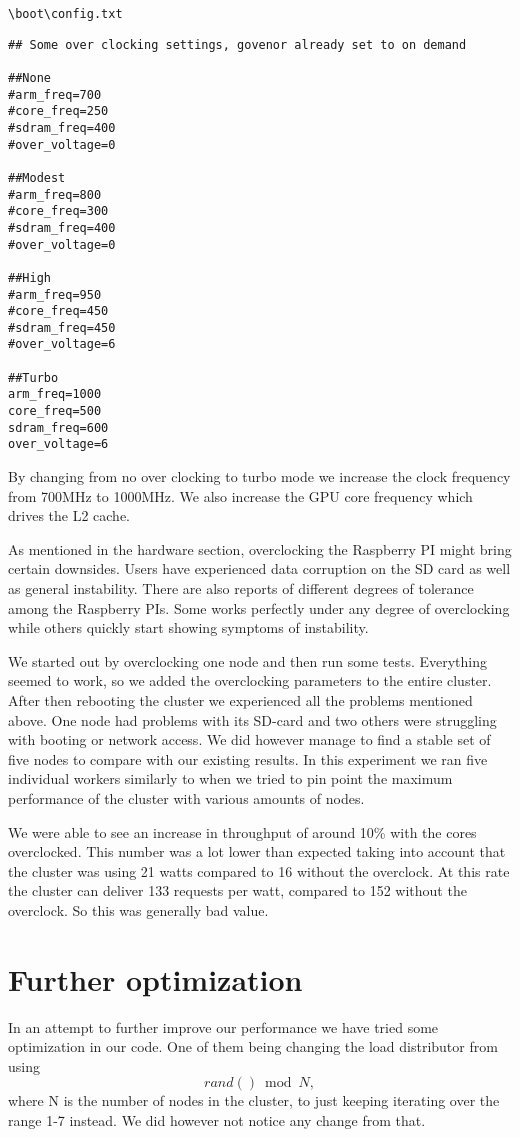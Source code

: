 \begin{lstlisting}
\boot\config.txt
\end{lstlisting} 

\begin{lstlisting}
## Some over clocking settings, govenor already set to on demand

##None
#arm_freq=700
#core_freq=250
#sdram_freq=400
#over_voltage=0

##Modest
#arm_freq=800
#core_freq=300
#sdram_freq=400
#over_voltage=0

##High
#arm_freq=950
#core_freq=450
#sdram_freq=450
#over_voltage=6

##Turbo
arm_freq=1000
core_freq=500
sdram_freq=600
over_voltage=6
\end{lstlisting}

By changing from no over clocking to turbo mode we increase the clock frequency from 700MHz to 1000MHz. We also increase the GPU core frequency which drives the L2 cache.

As mentioned in the hardware section, overclocking the Raspberry PI might bring certain downsides. Users have experienced data corruption on the SD card as well as general instability. There are also reports of different degrees of tolerance among the Raspberry PIs. Some works perfectly under any degree of overclocking while others quickly start showing symptoms of instability.

We started out by overclocking one node and then run some tests. Everything seemed to work, so we added the overclocking parameters to the entire cluster. After then rebooting the cluster we experienced all the problems mentioned above. One node had problems with its SD-card and two others were struggling with booting or network access. We did however manage to find a stable set of five nodes to compare with our existing results. In this experiment we ran five individual workers similarly to when we tried to pin point the maximum performance of the cluster with various amounts of nodes. 

We were able to see an increase in throughput of around 10\% with the cores overclocked. This number was a lot lower than expected taking into account that the cluster was using 21 watts compared to 16 without the overclock. At this rate the cluster can deliver 133 requests per watt, compared to 152 without the overclock. So this was generally bad value.

\section{Further optimization}
In an attempt to further improve our performance we have tried some optimization in our code. One of them being changing the load distributor from using $$rand() \bmod N,$$ where N is the number of nodes in the cluster, to just keeping iterating over the range 1-7 instead. We did however not notice any change from that.

